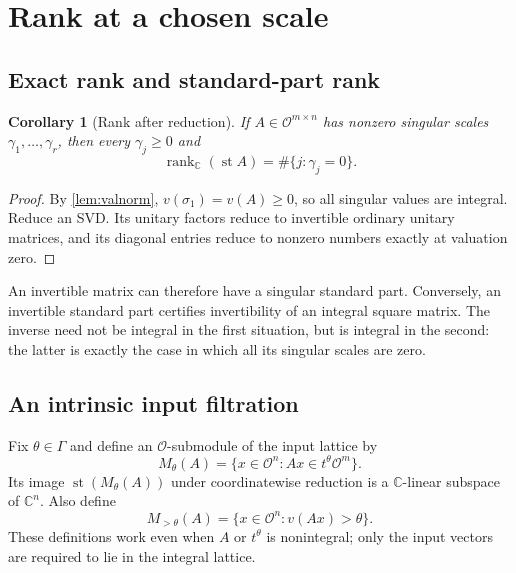 \documentclass[11pt,a4paper]{article}
\numberwithin{equation}{section}
\newtheorem{corollary}[corollary]{Corollary}
\theoremstyle{definition}
\theoremstyle{remark}
\newcommand{\C}{\mathbb C}
\newcommand{\OO}{\mathcal O}
\newcommand{\st}{\operatorname{st}}
\newcommand{\rank}{\operatorname{rank}}
\begin{document}
\section{Rank at a chosen scale}\label{sec:rank}

\subsection{Exact rank and standard-part rank}
\begin{corollary}[Rank after reduction]\label{cor:stRank}
If $A\in\OO^{m\times n}$ has nonzero singular scales
$\gamma_1,\ldots,\gamma_r$, then every $\gamma_j\ge0$ and
\[
 \rank_\C(\st A)=\#\{j:\gamma_j=0\}.
\]
\end{corollary}
\begin{proof}
By \cref{lem:valnorm}, $v(\sigma_1)=v(A)\ge0$, so all singular values
are integral. Reduce an SVD. Its unitary factors reduce to invertible
ordinary unitary matrices, and its diagonal entries reduce to nonzero
numbers exactly at valuation zero.
\end{proof}

An invertible matrix can therefore have a singular standard part. Conversely,
an invertible standard part certifies invertibility of an integral square
matrix. The inverse need not be integral in the first situation, but is
integral in the second: the latter is exactly the case in which all its
singular scales are zero.

\subsection{An intrinsic input filtration}
Fix $\theta\in\Gamma$ and define an $\OO$-submodule of the input lattice by
\begin{equation}\label{eq:latticefiltration}
 M_\theta(A)=\{x\in\OO^n:Ax\in t^\theta\OO^m\}.
\end{equation}
Its image $\st(M_\theta(A))$ under coordinatewise reduction is a
$\C$-linear subspace of $\C^n$. Also define
\[
 M_{>\theta}(A)=\{x\in\OO^n:v(Ax)>\theta\}.
\]
These definitions work even when $A$ or $t^\theta$ is nonintegral; only the
input vectors are required to lie in the integral lattice.
\end{document}

